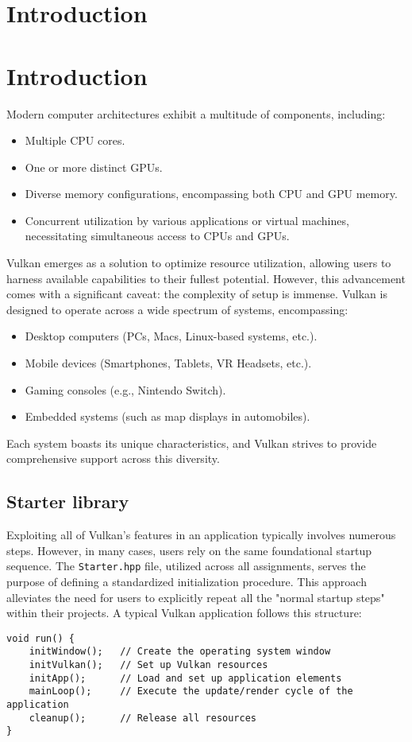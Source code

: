 \section{Introduction}

\section{Introduction}

Modern computer architectures exhibit a multitude of components, including:
\begin{itemize}
    \item Multiple CPU cores.
    \item One or more distinct GPUs.
    \item Diverse memory configurations, encompassing both CPU and GPU memory.
    \item Concurrent utilization by various applications or virtual machines, necessitating simultaneous access to CPUs and GPUs.
\end{itemize}

Vulkan emerges as a solution to optimize resource utilization, allowing users to harness available capabilities to their fullest potential. 
However, this advancement comes with a significant caveat: the complexity of setup is immense.
Vulkan is designed to operate across a wide spectrum of systems, encompassing:
\begin{itemize}
    \item Desktop computers (PCs, Macs, Linux-based systems, etc.).
    \item Mobile devices (Smartphones, Tablets, VR Headsets, etc.).
    \item Gaming consoles (e.g., Nintendo Switch).
    \item Embedded systems (such as map displays in automobiles).
\end{itemize}
Each system boasts its unique characteristics, and Vulkan strives to provide comprehensive support across this diversity.

\subsection{Starter library}
Exploiting all of Vulkan's features in an application typically involves numerous steps. 
However, in many cases, users rely on the same foundational startup sequence.
The \texttt{Starter.hpp} file, utilized across all assignments, serves the purpose of defining a standardized initialization procedure. 
This approach alleviates the need for users to explicitly repeat all the "normal startup steps" within their projects.
A typical Vulkan application follows this structure:
\begin{verbatim}
void run() {
    initWindow();   // Create the operating system window
    initVulkan();   // Set up Vulkan resources
    initApp();      // Load and set up application elements
    mainLoop();     // Execute the update/render cycle of the application
    cleanup();      // Release all resources
}
\end{verbatim}

